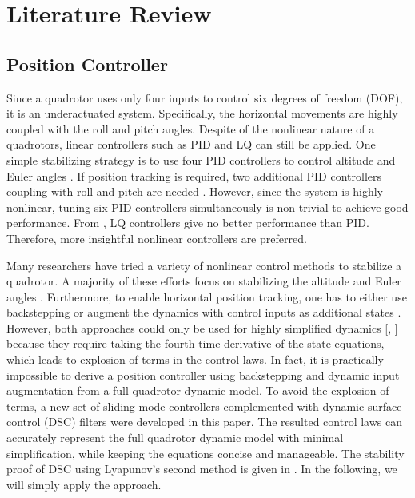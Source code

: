 \documentclass[journal,11pt,onecolumn,draftclsnofoot,]{IEEEtran}
\begin{document}
\section{\textbf{Literature Review}}

\subsection{Position Controller}
Since a quadrotor uses only four inputs to control six degrees of freedom (DOF), it is an underactuated system. Specifically, the horizontal movements are highly coupled with the roll and pitch angles. Despite of the nonlinear nature of a quadrotors, linear controllers such as PID and LQ can still be applied. One simple stabilizing strategy is to use four PID controllers to control altitude and Euler angles \cite{bouabdallah2004pid}. If position tracking is required, two additional PID controllers coupling with roll and pitch are needed \cite{li2011dynamic}. However, since the system is highly nonlinear, tuning six PID controllers simultaneously is non-trivial to achieve good performance. From \cite{bouabdallah2004pid}, LQ controllers give no better performance than PID. Therefore, more insightful nonlinear controllers are preferred.

Many researchers have tried a variety of nonlinear control methods to stabilize a quadrotor. A majority of these efforts focus on stabilizing the altitude and Euler angles \cite{bouabdallah2005backstepping, bouchoucha2008step, bouadi2011adaptive}. Furthermore, to enable horizontal position tracking, one has to either use backstepping \cite{lee2009feedback,madani2006backstepping,bouadi2007sliding,huang2010adaptive} or augment the dynamics with control inputs as additional states \cite{lee2009feedback}. However, both approaches could only be used for highly simplified dynamics [, ] because they require taking the fourth time derivative of the state equations, which leads to explosion of terms in the control laws. In fact, it is practically impossible to derive a position controller using backstepping and dynamic input augmentation from a full quadrotor dynamic model. To avoid the explosion of terms, a new set of sliding mode controllers complemented with dynamic surface control (DSC) filters \cite{song2011dynamic} were developed in this paper. The resulted control laws can accurately represent the full quadrotor dynamic model with minimal simplification, while keeping the equations concise and manageable. The stability proof of DSC using Lyapunov's second method is given in \cite{song2011dynamic}. In the following, we will simply apply the approach.
\end{document}
